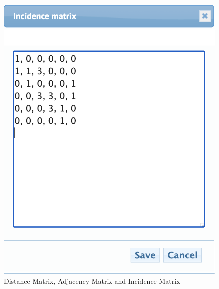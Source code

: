 \begin{figure}[h]
\begin{minipage}{.3\textwidth}
\end{minipage}

\begin{minipage}{.3\textwidth}
\centering
\includegraphics[width=0.85\linewidth]{img/IncidenceMatrix}
\caption{Distance Matrix, Adjacency Matrix and Incidence Matrix}
\label{fig:incidencematrix}
\end{minipage}
\end{figure}


